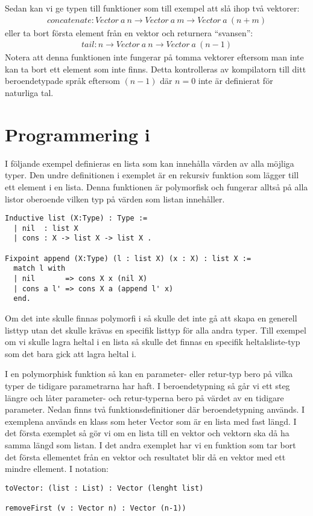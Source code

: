 Sedan kan vi ge typen till funktioner som till exempel att slå ihop två
vektorer:
\begin{align*}
  concatenate : Vector\ a\ n \to Vector\ a\ m \to Vector\ a\ (n+m)
\end{align*}
eller ta bort första element från en vektor och returnera ``svansen'':
\begin{align*}
  tail : n \to Vector\ a\ n \to Vector\ a\ (n-1)
\end{align*}
Notera att denna funktionen inte fungerar på tomma vektorer eftersom man inte
kan ta bort ett element som inte finns. Detta kontrolleras av kompilatorn till
ditt beroendetypade språk eftersom $(n-1)$ där $n=0$ inte är definierat för
naturliga tal.

\section{Programmering i \coq}
I följande exempel definieras en lista som kan innehålla värden av alla möjliga
typer. Den undre definitionen i exemplet är en rekursiv funktion som lägger
till ett element i en lista. Denna funktionen är polymorfisk och fungerar
alltså på alla listor oberoende vilken typ på värden som listan innehåller.
\begin{lstlisting}
Inductive list (X:Type) : Type :=
  | nil  : list X
  | cons : X -> list X -> list X .

Fixpoint append (X:Type) (l : list X) (x : X) : list X :=
  match l with
  | nil       => cons X x (nil X)
  | cons a l' => cons X a (append l' x)
  end.
\end{lstlisting}

Om det inte skulle finnas polymorfi i \coq så skulle det inte gå att skapa en
generell listtyp utan det skulle krävas en specifik listtyp för alla andra
typer. Till exempel om vi skulle lagra heltal i en lista så skulle det finnas
en specifik heltalsliste-typ som det bara gick att lagra heltal i.

I en polymorphisk funktion så kan en parameter- eller retur-typ bero på vilka
typer de tidigare parametrarna har haft. I beroendetypning så går vi ett steg
längre och låter parameter- och retur-typerna bero på värdet av en tidigare
parameter. Nedan finns två funktionsdefinitioner där beroendetypning används. I
exemplena används en klass som heter Vector som är en lista med fast längd. I
det första exemplet så gör vi om en lista till en vektor och vektorn ska då ha
samma längd som listan. I det andra exemplet har vi en funktion som tar bort
det första ellementet från en vektor och resultatet blir då en vektor med ett
mindre ellement. I \coq notation:
\begin{verbatim}
toVector: (list : List) : Vector (lenght list)

removeFirst (v : Vector n) : Vector (n-1))
\end{verbatim}

